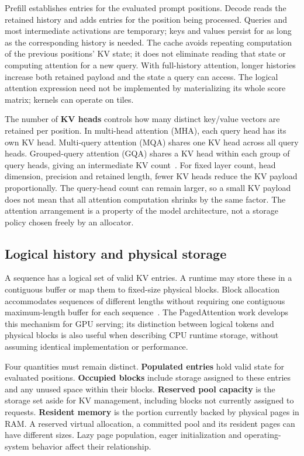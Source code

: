 Prefill establishes entries for the evaluated prompt positions.  Decode
reads the retained history and adds entries for the position being
processed.  Queries and most intermediate activations are temporary;
keys and values persist for as long as the corresponding history is
needed.  The cache avoids repeating computation of the previous
positions' KV state; it does not eliminate reading that state or
computing attention for a new query.  With full-history attention, longer
histories increase both retained payload and the state a query can access.
The logical attention expression need not be implemented by materializing
its whole score matrix; kernels can operate on tiles.

The number of \textbf{KV heads} controls how many distinct key/value
vectors are retained per position.  In multi-head attention (MHA), each
query head has its own KV head.  Multi-query attention (MQA) shares one
KV head across all query heads.  Grouped-query attention (GQA) shares a
KV head within each group of query heads, giving an intermediate KV
count~\cite{ainslie2023gqa}.  For fixed layer count, head dimension,
precision and retained length, fewer KV heads reduce the KV payload
proportionally.  The query-head count can remain larger, so a small KV
payload does not mean that all attention computation shrinks by the same
factor.  The attention arrangement is a property of the model architecture,
not a storage policy chosen freely by an allocator.

\subsection{Logical history and physical storage}

A sequence has a logical set of valid KV entries.  A runtime may store
these in a contiguous buffer or map them to fixed-size physical blocks.
Block allocation accommodates sequences of different lengths without
requiring one contiguous maximum-length buffer for each
sequence~\cite{kwon2023pagedattention}.  The PagedAttention work develops
this mechanism for GPU serving; its distinction between logical tokens
and physical blocks is also useful when describing CPU runtime storage,
without assuming identical implementation or performance.

Four quantities must remain distinct.  \textbf{Populated entries} hold
valid state for evaluated positions.  \textbf{Occupied blocks} include
storage assigned to these entries and any unused space within their
blocks.  \textbf{Reserved pool capacity} is the storage set aside for
KV management, including blocks not currently assigned to requests.
\textbf{Resident memory} is the portion currently backed by physical
pages in RAM.  A reserved virtual allocation, a committed pool and its
resident pages can have different sizes.  Lazy page population, eager
initialization and operating-system behavior affect their relationship.

